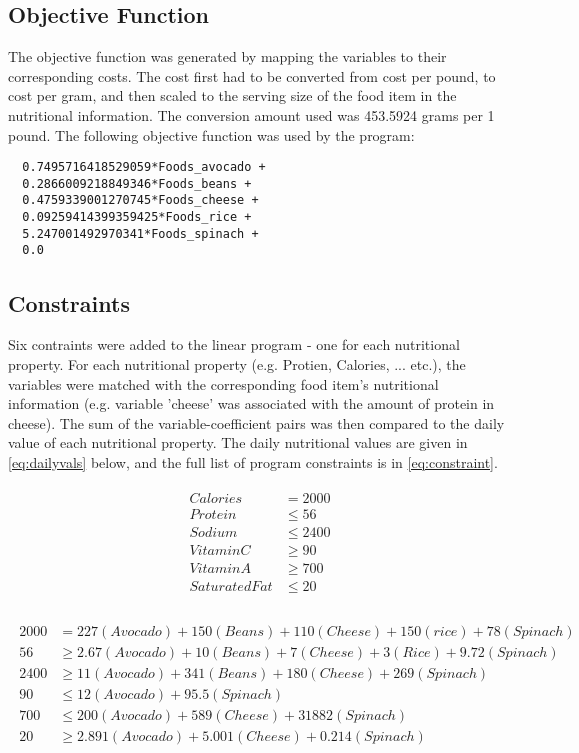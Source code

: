 \documentclass[paper=a4, fontsize=11pt]{scrartcl}
\numberwithin{equation}{section}		%
\numberwithin{figure}{section}			%
\numberwithin{table}{section}				%
\begin{document}
\subsection{Objective Function}
The objective function was generated by mapping the variables to their corresponding costs. The cost first had to be converted from cost per pound, to cost per gram, and then scaled to the serving size of the food item in the nutritional information. The conversion amount used was 453.5924 grams per 1 pound. The following objective function was used by the program: 

\begin{lstlisting}
  0.7495716418529059*Foods_avocado +
  0.2866009218849346*Foods_beans +
  0.4759339001270745*Foods_cheese +
  0.09259414399359425*Foods_rice +
  5.247001492970341*Foods_spinach +
  0.0
\end{lstlisting}


\subsection{Constraints}
Six contraints were added to the linear program - one for each nutritional property. For each nutritional property (e.g. Protien, Calories, ... etc.), the variables were matched with the corresponding food item's nutritional information (e.g. variable 'cheese' was associated with the amount of protein in cheese). The sum of the variable-coefficient pairs was then compared to the daily value of each nutritional property. The daily nutritional values are given in \eqref{eq:dailyvals} below, and the full list of program constraints is in \eqref{eq:constraint}.

\begin{align}
  \begin{split}
    Calories &= 2000\\
    Protein &\le 56 \\
    Sodium &\le 2400 \\
    Vitamin C &\ge 90 \\
    Vitamin A &\ge 700\\
    Saturated Fat &\le 20\\
  \end{split}
  \label{eq:dailyvals}
\end{align}


\begin{align} 
	\begin{split}
      2000 &= 227(Avocado) + 150(Beans) + 110(Cheese) + 150(rice) + 78(Spinach)\\
      56 &\ge 2.67(Avocado) + 10(Beans) + 7(Cheese) + 3(Rice) + 9.72(Spinach)\\
      2400 &\ge 11(Avocado) + 341(Beans) + 180(Cheese) + 269(Spinach)\\
      90 &\le 12(Avocado) + 95.5(Spinach)\\
      700 &\le 200(Avocado) + 589(Cheese) + 31882(Spinach)\\
      20 &\ge 2.891(Avocado) + 5.001(Cheese) + 0.214(Spinach)\\
	\end{split}
    \label{eq:constraint}
\end{align}
\end{document}
